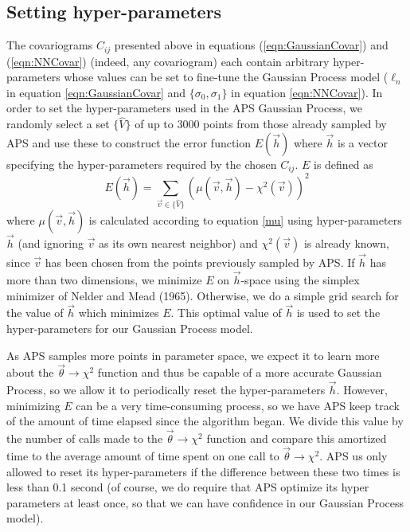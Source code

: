 \documentclass[useAMS,usenatbib]{aastex}
\begin{document}
\subsection{Setting hyper-parameters}
\label{sec:hyperparams}

The covariograms $C_{ij}$ presented above in equations (\ref{eqn:GaussianCovar})
and (\ref{eqn:NNCovar}) (indeed, any covariogram)
each contain arbitrary hyper-parameters whose values can be set to fine-tune
the Gaussian Process model ($\ell_n$ in equation \ref{eqn:GaussianCovar}
and $\{\sigma_0,\sigma_1\}$ in equation \ref{eqn:NNCovar}).  
In order to set the hyper-parameters used in the APS Gaussian Process, we randomly
select a set $\{\hat{V}\}$ of up to 3000 points from those already sampled by APS 
and use these to construct
the error function $E(\vec{h})$ where $\vec{h}$ is a vector specifying the hyper-parameters
required by the chosen $C_{ij}$.  $E$ is defined as
\begin{equation}
\label{eqn:hyperparamError}
E(\vec{h})=\sum_{\vec{v}\in\{\hat{V}\}}\left(\mu(\vec{v},\vec{h})-\chi^2(\vec{v})\right)^2
\end{equation}
where $\mu(\vec{v},\vec{h})$ is calculated according to equation \ref{mu} using
hyper-parameters $\vec{h}$ (and ignoring $\vec{v}$ as its own nearest neighbor) and
$\chi^2(\vec{v})$ is already known, since $\vec{v}$ has been chosen from the points previously
sampled by APS.  If $\vec{h}$ has more than two dimensions, we minimize $E$ on $\vec{h}$-space
using the simplex
minimizer of Nelder and Mead (1965).  Otherwise, we do a simple grid search for the value of
$\vec{h}$ which minimizes $E$.  This optimal value of $\vec{h}$ is used to set
the hyper-parameters for our Gaussian Process model.

As APS samples more points in parameter space, we expect it to learn more about the
$\vec{\theta}\rightarrow\chi^2$ function and thus be capable of a more accurate Gaussian
Process, so we allow it to periodically reset the hyper-parameters $\vec{h}$.  However,
minimizing $E$ can be a very time-consuming process, so we have APS keep track of the amount of
time elapsed since the algorithm began.  We divide this value by the number of calls made to
the $\vec{\theta}\rightarrow\chi^2$ function and compare this amortized time to the average
amount of time spent on one call to $\vec{\theta}\rightarrow\chi^2$.  APS us only allowed to
reset its hyper-parameters if the difference between these two times is less than 0.1 second
(of course, we do require that APS optimize its hyper parameters at least once, so that
we can have confidence in our Gaussian Process model).
\end{document}
